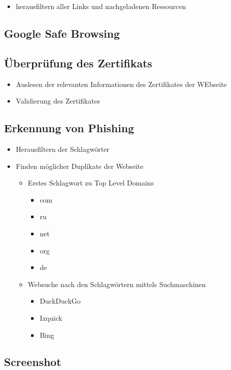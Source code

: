 
\begin{itemize}
  \item herausfiltern aller Links und nachgeladenen Ressourcen
\end{itemize}

\subsection{Google Safe Browsing}


\subsection{Überprüfung des Zertifikats}


\begin{itemize}
  \item Auslesen der relevanten Informationen des Zertifikates der WEbseite
  \item Validierung des Zertifikates
\end{itemize}

\subsection{Erkennung von Phishing}


\begin{itemize}
  \item Herausfiltern der Schlagwörter
  \item Finden möglicher Duplikate der Webseite
  \begin{itemize}
    \item Erstes Schlagwort zu Top Level Domains
    \begin{itemize}
      \item com
      \item ru
      \item net
      \item org
      \item de
    \end{itemize}
    \item Websuche nach den Schlagwörtern mittels Suchmaschinen
    \begin{itemize}
      \item DuckDuckGo
      \item Ixquick
      \item Bing
    \end{itemize}
  \end{itemize}
\end{itemize}

\subsection{Screenshot}

